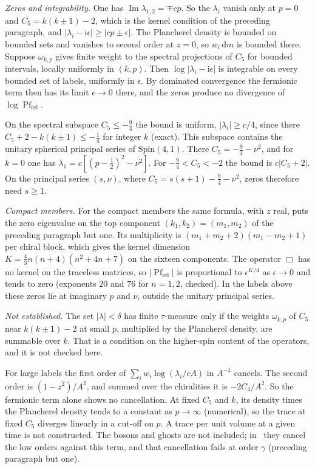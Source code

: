 \emph{Zeros and integrability.} One has \(\operatorname{Im}\lambda_{1,2}=\mp cp\). So the \(\lambda_i\) vanish only at \(p=0\) and \(C_5=k(k\pm1)-2\), which is the kernel condition of the preceding paragraph, and \(|\lambda_i-\mathrm i\epsilon|\ge|cp\pm\epsilon|\). The Plancherel density is bounded on bounded sets and vanishes to second order at \(z=0\), so \(w_i\,\mathrm dm\) is bounded there. Suppose \(\omega_{k,p}\) gives finite weight to the spectral projections of \(C_5\) for bounded intervals, locally uniformly in \((k,p)\). Then \(\log|\lambda_i-\mathrm i\epsilon|\) is integrable on every bounded set of labels, uniformly in \(\epsilon\). By dominated convergence the fermionic term then has its limit \(\epsilon\to0\) there, and the zeros produce no divergence of \(\log\operatorname{Pf}_{\mathrm{rel}}\).

On the spectral subspace \(C_5\le-\tfrac94\) the bound is uniform, \(|\lambda_i|\ge c/4\), since there \(C_5+2-k(k\pm1)\le-\tfrac14\) for integer \(k\) (exact). This subspace contains the unitary spherical principal series of \(\mathrm{Spin}(4,1)\). There \(C_5=-\tfrac94-\nu^2\), and for \(k=0\) one has \(\lambda_1=c[(p-\tfrac{\mathrm i}2)^2-\nu^2]\). For \(-\tfrac94<C_5<-2\) the bound is \(c|C_5+2|\). On the principal series \((s,\nu)\), where \(C_5=s(s+1)-\tfrac94-\nu^2\), zeros therefore need \(s\ge1\).

\emph{Compact members.} For the compact members the same formula, with \(z\) real, puts the zero eigenvalue on the top component \((k_1,k_2)=(m_1,m_2)\) of the preceding paragraph but one. Its multiplicity is \((m_1+m_2+2)(m_1-m_2+1)\) per chiral block, which gives the kernel dimension \(K=\tfrac43n(n+4)(n^2+4n+7)\) on the sixteen components. The operator \(\Box\) has no kernel on the traceless matrices, so \(|\operatorname{Pf}_{\mathrm{rel}}|\) is proportional to \(\epsilon^{K/4}\) as \(\epsilon\to0\) and tends to zero (exponents \(20\) and \(76\) for \(n=1,2\), checked). In the labels above these zeros lie at imaginary \(p\) and \(\nu\), outside the unitary principal series.

\emph{Not established.} The set \(|\lambda|<\delta\) has finite \(\tau\)-measure only if the weights \(\omega_{k,p}\) of \(C_5\) near \(k(k\pm1)-2\) at small \(p\), multiplied by the Plancherel density, are summable over \(k\). That is a condition on the higher-spin content of the operators, and it is not checked here.

For large labels the first order of \(\sum_iw_i\log(\lambda_i/cA)\) in \(A^{-1}\) cancels. The second order is \((1-z^2)/A^2\), and summed over the chiralities it is \(-2C_4/A^2\). So the fermionic term alone shows no cancellation. At fixed \(C_5\) and \(k\), its density times the Plancherel density tends to a constant as \(p\to\infty\) (numerical), so the trace at fixed \(C_5\) diverges linearly in a cut-off on \(p\). A trace per unit volume at a given time is not constructed. The bosons and ghosts are not included; in~\cite{Steinacker2023} they cancel the low orders against this term, and that cancellation fails at order \(\gamma\) (preceding paragraph but one).

